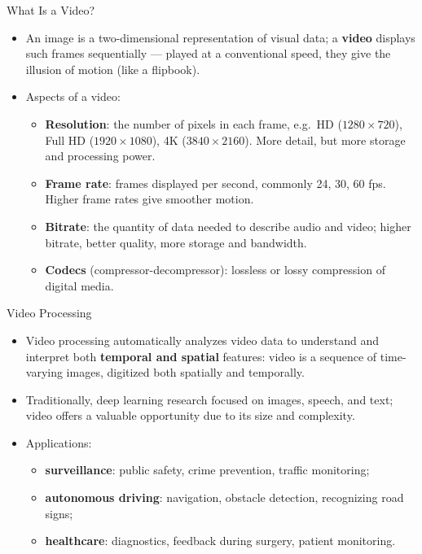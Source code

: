 \begin{frame}{What Is a Video?}
\begin{itemize}
  \item An image is a two-dimensional representation of visual data; a \textbf{video} displays such frames sequentially --- played at a conventional speed, they give the illusion of motion (like a flipbook).
  \item Aspects of a video:
  \begin{itemize}
    \item \textbf{Resolution}: the number of pixels in each frame, e.g.\ HD ($1280\times720$), Full HD ($1920\times1080$), 4K ($3840\times2160$). More detail, but more storage and processing power.
    \item \textbf{Frame rate}: frames displayed per second, commonly 24, 30, 60 fps. Higher frame rates give smoother motion.
    \item \textbf{Bitrate}: the quantity of data needed to describe audio and video; higher bitrate, better quality, more storage and bandwidth.
    \item \textbf{Codecs} (compressor-decompressor): lossless or lossy compression of digital media.
  \end{itemize}
\end{itemize}
\end{frame}

\begin{frame}{Video Processing}
\begin{itemize}
  \item Video processing automatically analyzes video data to understand and interpret both \textbf{temporal and spatial} features: video is a sequence of time-varying images, digitized both spatially and temporally.
  \item Traditionally, deep learning research focused on images, speech, and text; video offers a valuable opportunity due to its size and complexity.
  \item Applications:
  \begin{itemize}
    \item \textbf{surveillance}: public safety, crime prevention, traffic monitoring;
    \item \textbf{autonomous driving}: navigation, obstacle detection, recognizing road signs;
    \item \textbf{healthcare}: diagnostics, feedback during surgery, patient monitoring.
  \end{itemize}
\end{itemize}
\end{frame}

